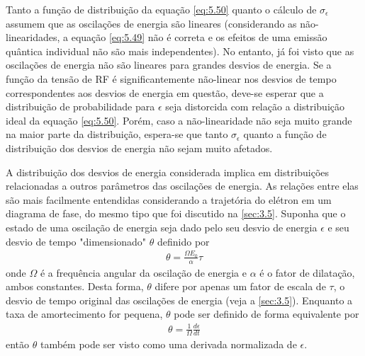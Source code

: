 Tanto a função de distribuição da equação \eqref{eq:5.50} quanto o cálculo de $\sigma_\epsilon$ assumem que as oscilações de energia são lineares (considerando as não-linearidades, a equação \eqref{eq:5.49} não é correta e os efeitos de uma emissão quântica individual não são mais independentes). No entanto, já foi visto que as oscilações de energia não são lineares para grandes desvios de energia. Se a função da tensão de RF é significantemente não-linear nos desvios de tempo correspondentes aos desvios de energia em questão, deve-se esperar que a distribuição de probabilidade para $\epsilon$ seja distorcida com relação a distribuição ideal da equação \eqref{eq:5.50}. Porém, caso a não-linearidade não seja muito grande na maior parte da distribuição, espera-se que tanto $\sigma_\epsilon$ quanto a função de distribuição dos desvios de energia não sejam muito afetados.

A distribuição dos desvios de energia considerada implica em distribuições relacionadas a outros parâmetros das oscilações de energia. As relações entre elas são mais facilmente entendidas considerando a trajetória do elétron em um diagrama de fase, do mesmo tipo que foi discutido na \autoref{sec:3.5}. Suponha que o estado de uma oscilação de energia seja dado pelo seu desvio de energia $\epsilon$ e seu desvio de tempo "dimensionado" $\theta$ definido por
\begin{align}
	\theta = \frac{\Omega E_0}{\alpha}\tau\label{eq:5.52}
\end{align}
onde $\Omega$ é a frequência angular da oscilação de energia e $\alpha$ é o fator de dilatação, ambos constantes. Desta forma, $\theta$ difere por apenas um fator de escala de $\tau$, o desvio de tempo original das oscilações de energia (veja a \autoref{sec:3.5}). Enquanto a taxa de amortecimento for pequena, $\theta$ pode ser definido de forma equivalente por
\begin{align}
	\theta = \frac{1}{\Omega}\frac{d\epsilon}{dt}
\end{align}
então $\theta$ também pode ser visto como uma derivada normalizada de $\epsilon$.

